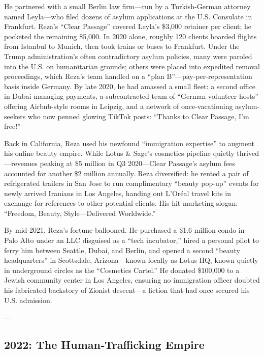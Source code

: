 He partnered with a small Berlin law firm—run by a Turkish-German attorney named Leyla—who filed dozens of asylum applications at the U.S. Consulate in Frankfurt. Reza’s “Clear Passage” covered Leyla’s \$3,000 retainer per client; he pocketed the remaining \$5,000. In 2020 alone, roughly 120 clients boarded flights from Istanbul to Munich, then took trains or buses to Frankfurt. Under the Trump administration’s often contradictory asylum policies, many were paroled into the U.S. on humanitarian grounds; others were placed into expedited removal proceedings, which Reza’s team handled on a “plan B”—pay-per-representation basis inside Germany. By late 2020, he had amassed a small fleet: a second office in Dubai managing payments, a subcontracted team of “German volunteer hosts” offering Airbnb-style rooms in Leipzig, and a network of once-vacationing asylum-seekers who now penned glowing TikTok posts: “Thanks to Clear Passage, I’m free!”

Back in California, Reza used his newfound “immigration expertise” to augment his online beauty empire. While Lotus \& Sage’s cosmetics pipeline quietly thrived—revenues peaking at \$5 million in Q3 2020—Clear Passage’s asylum fees accounted for another \$2 million annually. Reza diversified: he rented a pair of refrigerated trailers in San Jose to run complimentary “beauty pop-up” events for newly arrived Iranians in Los Angeles, handing out L’Oréal travel kits in exchange for references to other potential clients. His hit marketing slogan: “Freedom, Beauty, Style—Delivered Worldwide.”

By mid-2021, Reza’s fortune ballooned. He purchased a \$1.6 million condo in Palo Alto under an LLC disguised as a “tech incubator,” hired a personal pilot to ferry him between Seattle, Dubai, and Berlin, and opened a second “beauty headquarters” in Scottsdale, Arizona—known locally as Lotus HQ, known quietly in underground circles as the “Cosmetics Cartel.” He donated \$100,000 to a Jewish community center in Los Angeles, ensuring no immigration officer doubted his fabricated backstory of Zionist descent—a fiction that had once secured his U.S. admission.

---

\subsection{2022: The Human‐Trafficking Empire}

